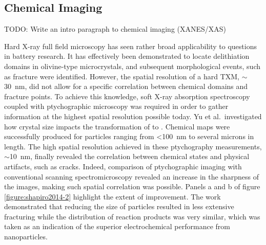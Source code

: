 \documentclass[journal=cmatex,manuscript=perspective]{achemso}
\begin{document}
\subsection{Chemical Imaging}

TODO: Write an intro paragraph to chemical imaging (XANES/XAS)

Hard X-ray full field microscopy has seen rather broad applicability
to questions in battery research. It has effectively been demonstrated
to locate delithiation domains in olivine-type 
microcrystals, and subsequent morphological events, such as fracture
were identified\cite{boesenberg2013}. However, the spatial resolution
of a hard TXM, $\sim$\SI{30}{nm}, did not allow for a specific
correlation between chemical domains and fracture points. To achieve
this knowledge, soft X-ray absorption spectroscopy coupled with
ptychographic microscopy was required in order to gather information
at the highest spatial resolution possible today. Yu et
al.\ investigated how crystal size impacts the transformation of
 to \cite{yu2015-2}. Chemical maps were
successfully produced for particles ranging from <\SI{100}{nm} to
several microns in length. The high spatial resolution achieved in
these ptychography measurements, $\sim$\SI{10}{nm}, finally revealed
the correlation between chemical states and physical artifacts, such
as cracks. Indeed, comparison of ptychographic imaging with
conventional scanning spectromicroscopy revealed an increase in the
sharpness of the images, making such spatial correlation was
possible. Panels a and b of figure \ref{figure:shapiro2014-2}
highlight the extent of improvement\cite{shapiro2014}. The work
demonstrated that reducing the size of  particles resulted
in less extensive fracturing while the distribution of reaction
products was very similar, which was taken as an indication of the
superior electrochemical performance from 
nanoparticles\cite{yu2015-2}.
\end{document}
